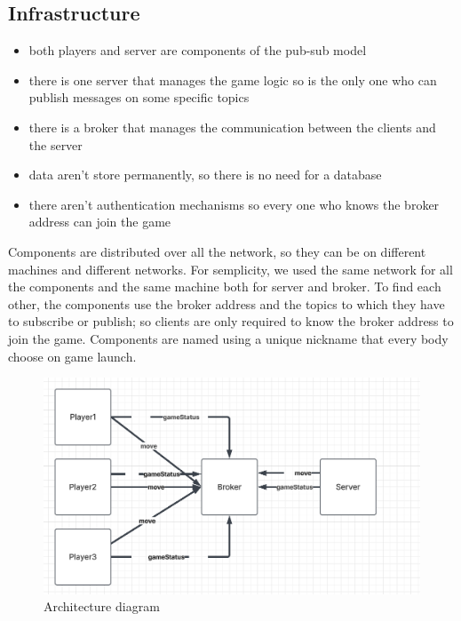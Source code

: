 \documentclass{scrartcl}
\begin{document}
\subsection{Infrastructure}\label{infrastructure}

\begin{itemize}
    \item both players and server are components of the pub-sub model
    \item there is one server that manages the game logic so is the only one who can publish messages on some specific topics
    \item there is a broker that manages the communication between the clients and the server
    \item data aren't store permanently, so there is no need for a database
    \item there aren't authentication mechanisms so every one who knows the broker address can join the game

\end{itemize}
Components are distributed over all the network, so they can be on different machines and different networks. For semplicity, we used the same network for all the components and the same machine both for server and broker. \newline
To find each other, the components use the broker address and the topics to which they have to subscribe or publish; so clients are only required to know the broker address to join the game. \newline
Components are named using a unique nickname that every body choose on game launch.


\begin{figure}[H]
    \caption{Architecture diagram}
    \centering
    \includegraphics[scale=0.5]{figures/pubsubdiagram.png}
\end{figure}
\end{document}
